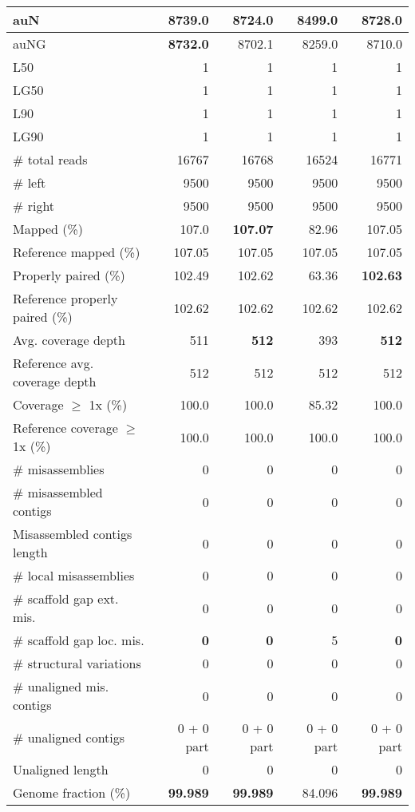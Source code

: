 \documentclass[12pt,a4paper]{article}
\begin{document}
\begin{table}[ht]
\begin{center}
\begin{tabular}{|l*{4}{|r}|}
auN & {\bf 8739.0} & 8724.0 & 8499.0 & 8728.0 \\ \hline
auNG & {\bf 8732.0} & 8702.1 & 8259.0 & 8710.0 \\ \hline
L50 & 1 & 1 & 1 & 1 \\ \hline
LG50 & 1 & 1 & 1 & 1 \\ \hline
L90 & 1 & 1 & 1 & 1 \\ \hline
LG90 & 1 & 1 & 1 & 1 \\ \hline
\# total reads & 16767 & 16768 & 16524 & 16771 \\ \hline
\# left & 9500 & 9500 & 9500 & 9500 \\ \hline
\# right & 9500 & 9500 & 9500 & 9500 \\ \hline
Mapped (\%) & 107.0 & {\bf 107.07} & 82.96 & 107.05 \\ \hline
Reference mapped (\%) & 107.05 & 107.05 & 107.05 & 107.05 \\ \hline
Properly paired (\%) & 102.49 & 102.62 & 63.36 & {\bf 102.63} \\ \hline
Reference properly paired (\%) & 102.62 & 102.62 & 102.62 & 102.62 \\ \hline
Avg. coverage depth & 511 & {\bf 512} & 393 & {\bf 512} \\ \hline
Reference avg. coverage depth & 512 & 512 & 512 & 512 \\ \hline
Coverage $\geq$ 1x (\%) & 100.0 & 100.0 & 85.32 & 100.0 \\ \hline
Reference coverage $\geq$ 1x (\%) & 100.0 & 100.0 & 100.0 & 100.0 \\ \hline
\# misassemblies & 0 & 0 & 0 & 0 \\ \hline
\# misassembled contigs & 0 & 0 & 0 & 0 \\ \hline
Misassembled contigs length & 0 & 0 & 0 & 0 \\ \hline
\# local misassemblies & 0 & 0 & 0 & 0 \\ \hline
\# scaffold gap ext. mis. & 0 & 0 & 0 & 0 \\ \hline
\# scaffold gap loc. mis. & {\bf 0} & {\bf 0} & 5 & {\bf 0} \\ \hline
\# structural variations & 0 & 0 & 0 & 0 \\ \hline
\# unaligned mis. contigs & 0 & 0 & 0 & 0 \\ \hline
\# unaligned contigs & 0 + 0 part & 0 + 0 part & 0 + 0 part & 0 + 0 part \\ \hline
Unaligned length & 0 & 0 & 0 & 0 \\ \hline
Genome fraction (\%) & {\bf 99.989} & {\bf 99.989} & 84.096 & {\bf 99.989} \\ \hline

\end{tabular}
\end{center}
\end{table}
\end{document}
